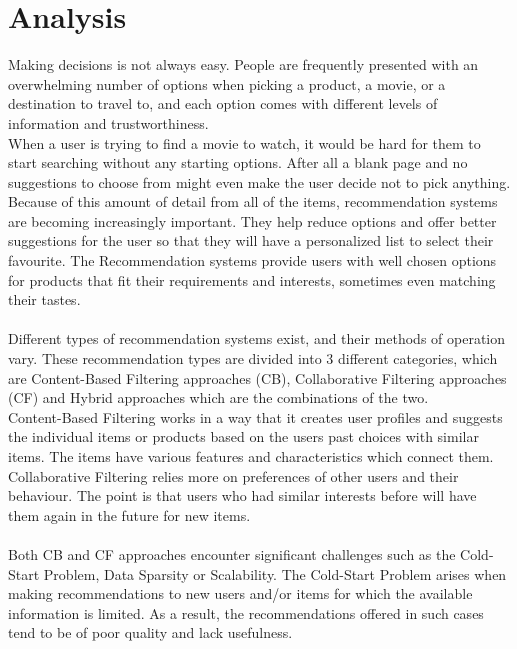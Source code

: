 \documentclass[10pt,oneside,english,a4paper]{article}
\begin{document}
\section{Analysis}
Making decisions is not always easy. People are frequently presented with an overwhelming number of options when picking a product, a movie, or a destination to travel to, and each option comes with different levels of information and trustworthiness. \\
When a user is trying to find a movie to watch, it would be hard for them to start searching without any starting options. After all a blank page and no suggestions to choose from might even make the user decide not to pick anything. \\ 
Because of this amount of detail from all of the items, recommendation systems are becoming increasingly important. They help reduce options and offer better suggestions for the user so that they will have a personalized list to select their favourite. The Recommendation systems provide users with well chosen options for products that fit their requirements and interests, sometimes even matching their tastes.\\\\
Different types of recommendation systems exist, and their methods of operation vary. These recommendation types are divided into 3 different categories, which are Content-Based Filtering approaches (CB), Collaborative Filtering approaches (CF) and Hybrid approaches which are the combinations of the two.\\
Content-Based Filtering works in a way that it creates user profiles and suggests the individual items or products based on the users past choices with similar items. The items have various features and characteristics which connect them.
Collaborative Filtering relies more on preferences of other users and their behaviour. The point is that users who had similar interests before will have them again in the future for new items.\\\\
Both CB and CF approaches encounter significant challenges such as the Cold-Start Problem, Data Sparsity or Scalability. The Cold-Start Problem arises when making recommendations to new users and/or items for which the available information is limited. As a result, the recommendations offered in such cases tend to be of poor quality and lack usefulness.\cite{Al-Hassan2024a}\\\\
%
\end{document}
